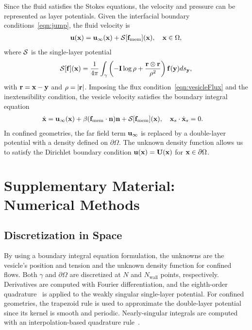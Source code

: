 \documentclass[9pt,twocolumn,twoside,lineno]{pnas-new}
\begin{document}
Since the fluid satisfies the Stokes equations, the velocity and
pressure can be represented as layer potentials. Given the interfacial
boundary conditions~\eqref{eqn:jump}, the fluid velocity is
\begin{align}
  \mathbf{u}(\mathbf{x}) = \mathbf{u}_\infty(\mathbf{x}) + \mathcal{S}[\mathbf{f}_\mathrm{mem}](\mathbf{x}), \quad
    \mathbf{x} \in \Omega,
\end{align}
where $\mathcal{S}$ is the single-layer potential
\begin{align}
  \mathcal{S}[\mathbf{f}](\mathbf{x}) = \frac{1}{4\pi} \int_{\gamma} \left(
    -\mathbf{I} \log\rho + \frac{\mathbf{r} \otimes \mathbf{r}}{\rho^2} \right)
    \mathbf{f}(\mathbf{y}) ds_{\mathbf{y}},
\end{align}
with $\mathbf{r} = \mathbf{x} - \mathbf{y}$ and $\rho = |\mathbf{r}|$. Imposing the flux
condition~\eqref{eqn:vesicleFlux} and the inextensibility condition, the
vesicle velocity satisfies the boundary integral equation
\begin{align}
  \label{eqn:vesVelocity}
  \dot{\mathbf{x}} &= \mathbf{u}_\infty(\mathbf{x}) + \beta (\mathbf{f}_\mathrm{mem}\cdot\mathbf{n})\mathbf{n}
  + \mathcal{S} [\mathbf{f}_\mathrm{mem}](\mathbf{x}),  \quad
  \mathbf{x}_s \cdot \dot{\mathbf{x}}_s = 0.
\end{align}
In confined geometries, the far field term $\mathbf{u}_\infty$ is replaced by a
double-layer potential with a density defined on $\partial\Omega$. The
unknown density function allows us to satisfy the Dirichlet boundary
condition $\mathbf{u}(\mathbf{x}) = \mathbf{U}(\mathbf{x})$ for $\mathbf{x} \in \partial\Omega$.


\section*{Supplementary Material: Numerical Methods}
\subsection*{Discretization in Space}
By using a boundary integral equation formulation, the unknowns are the
vesicle's position and tension and the unknown density function for
confined flows. Both $\gamma$ and $\partial\Omega$ are discretized at
$N$ and $N_\text{wall}$ points, respectively. Derivatives are computed
with Fourier differentiation, and the eighth-order
quadrature~\cite{alp1999} is applied to the weakly singular single-layer
potential. For confined geometries, the trapezoid rule is used to
approximate the double-layer potential since its kernel is smooth and
periodic. Nearly-singular integrals are computed with an
interpolation-based quadrature rule~\cite{qua-bir2014}.
\end{document}
